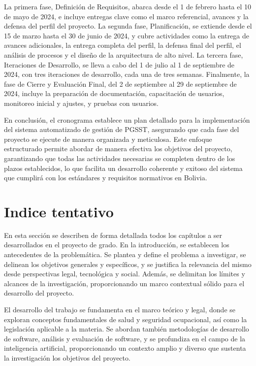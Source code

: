 La primera fase, Definición de Requisitos, abarca desde el 1 de febrero hasta el 10 de mayo de 2024, e incluye entregas clave como el marco referencial, avances y la defensa del perfil del proyecto. La segunda fase, Planificación, se extiende desde el 15 de marzo hasta el 30 de junio de 2024, y cubre actividades como la entrega de avances adicionales, la entrega completa del perfil, la defensa final del perfil, el análisis de procesos y el diseño de la arquitectura de alto nivel. La tercera fase, Iteraciones de Desarrollo, se lleva a cabo del 1 de julio al 1 de septiembre de 2024, con tres iteraciones de desarrollo, cada una de tres semanas. Finalmente, la fase de Cierre y Evaluación Final, del 2 de septiembre al 29 de septiembre de 2024, incluye la preparación de documentación, capacitación de usuarios, monitoreo inicial y ajustes, y pruebas con usuarios.

En conclusión, el cronograma establece un plan detallado para la implementación del sistema automatizado de gestión de PGSST, asegurando que cada fase del proyecto se ejecute de manera organizada y meticulosa. Este enfoque estructurado permite abordar de manera efectiva los objetivos del proyecto, garantizando que todas las actividades necesarias se completen dentro de los plazos establecidos, lo que facilita un desarrollo coherente y exitoso del sistema que cumplirá con los estándares y requisitos normativos en Bolivia.

\section{Indice tentativo}
En esta sección se describen de forma detallada todos los capítulos a ser desarrollados en el proyecto de grado. En la introducción, se establecen los antecedentes de la problemática. Se plantea y define el problema a investigar, se delinean los objetivos generales y específicos, y se justifica la relevancia del mismo desde perspectivas legal, tecnológica y social. Además, se delimitan los límites y alcances de la investigación, proporcionando un marco contextual sólido para el desarrollo del proyecto.

El desarrollo del trabajo se fundamenta en el marco teórico y legal, donde se exploran conceptos fundamentales de salud y seguridad ocupacional, así como la legislación aplicable a la materia. Se abordan también metodologías de desarrollo de software, análisis y evaluación de software, y se profundiza en el campo de la inteligencia artificial, proporcionando un contexto amplio y diverso que sustenta la investigación los objetivos del proyecto.

